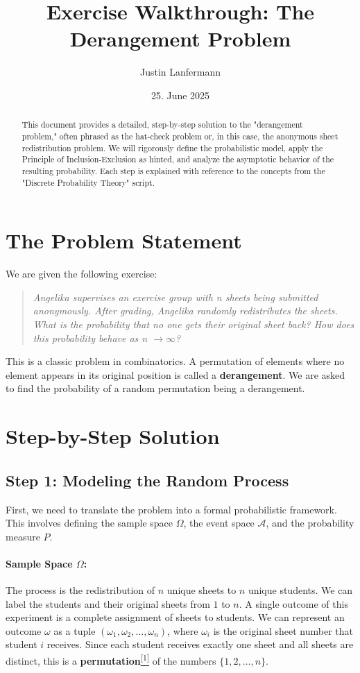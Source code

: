 \documentclass[11pt,a4paper]{article}
\title{Exercise Walkthrough: The Derangement Problem}
\author{Justin Lanfermann}
\date{25. June 2025}
\begin{document}
\maketitle

\begin{abstract}
    This document provides a detailed, step-by-step solution to the "derangement problem," often phrased as the hat-check problem or, in this case, the anonymous sheet redistribution problem. We will rigorously define the probabilistic model, apply the Principle of Inclusion-Exclusion as hinted, and analyze the asymptotic behavior of the resulting probability. Each step is explained with reference to the concepts from the "Discrete Probability Theory" script.
\end{abstract}

\section{The Problem Statement}
We are given the following exercise:
\begin{quote}
    \textit{Angelika supervises an exercise group with n sheets being submitted anonymously. After grading, Angelika randomly redistributes the sheets. What is the probability that no one gets their original sheet back? How does this probability behave as n $\to \infty$?}
\end{quote}
This is a classic problem in combinatorics. A permutation of elements where no element appears in its original position is called a \textbf{derangement}. We are asked to find the probability of a random permutation being a derangement.

\section{Step-by-Step Solution}

\subsection{Step 1: Modeling the Random Process}
First, we need to translate the problem into a formal probabilistic framework. This involves defining the sample space $\Omega$, the event space $\mathcal{A}$, and the probability measure $P$.

\paragraph{Sample Space $\Omega$:}
The process is the redistribution of $n$ unique sheets to $n$ unique students. We can label the students and their original sheets from $1$ to $n$. A single outcome of this experiment is a complete assignment of sheets to students. We can represent an outcome $\omega$ as a tuple $(\omega_1, \omega_2, \dots, \omega_n)$, where $\omega_i$ is the original sheet number that student $i$ receives. Since each student receives exactly one sheet and all sheets are distinct, this is a \textbf{permutation}\hyperlink{note:permutation}{\textsuperscript{[1]}} of the numbers $\{1, 2, \dots, n\}$.
\end{document}
